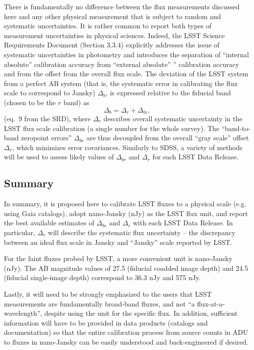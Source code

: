 \documentclass{emulateapj}
\begin{document}
There is fundamentally no difference between the flux measurements discussed
here and any other physical measurement that is subject to random and systematic
uncertainties. It is rather common to report both types of measurement uncertainties
in physical sciences. Indeed, the LSST  Science Requirements Document (Section 3.3.4)
explicitly addresses the issue of systematic uncertainties in photometry and
introduces the separation of ``internal absolute'' calibration accuracy 
from ``external absolute'' ” calibration accuracy and from the offset from the
overall flux scale. The deviation of the LSST system from a perfect AB system
(that is, the systematic error in calibrating the flux scale to correspond to Jansky)  
$\Delta_b$, is expressed relative to the fiducial band (chosen to be the $r$ band)
as \begin{equation}
             \Delta_b = \Delta_r + \Delta_{br}, 
\end{equation}
(eq.~9 from the SRD), where $\Delta_r$ describes overall systematic uncertainty 
in the LSST flux scale calibration (a single number for the whole survey). The 
``band-to-band zeropoint errors'' $\Delta_{br}$ are thus decoupled from the overall 
``gray scale'' offset $\Delta_{r}$, which minimizes error covariances. Similarly to SDSS, 
a variety of methods will be used to assess likely values of $\Delta_{br}$ and 
$\Delta_r$ for each LSST Data Release. 


\subsection{Summary} 

In summary, it is proposed here to calibrate LSST fluxes to a physical scale (e.g. using
Gaia catalogs), adopt nano-Jansky (nJy) as the LSST flux unit, and report the best available
estimates of $\Delta_{br}$ and $\Delta_r$ with each LSST Data Release. In particular, 
$\Delta_r$ will describe the systematic flux uncertainty --  the discrepancy between an 
ideal flux scale in Jansky and ``Jansky'' scale reported by LSST. 

For the faint fluxes probed by LSST, a more convenient unit is nano-Jansky (nJy). 
The AB magnitude values of 27.5 (fiducial coadded image depth)  and 24.5 (fiducial 
single-image depth) correspond to 36.3 nJy and 575 nJy. 

Lastly, it  will need to be strongly emphasized to the users that LSST measurements are 
fundamentally broad-band fluxes, and not ``a flux-at-a-wavelength'', despite using the 
unit for the specific flux. In addition, sufficient information will have to be provided 
in data products (catalogs and documentation) so that the entire calibration process from 
source counts in ADU to fluxes in nano-Jansky can be easily understood and back-engineered
if desired. 
\end{document}
